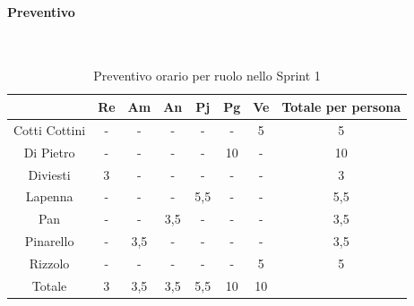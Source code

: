 \documentclass{article}
\begin{document}
                \paragraph{Preventivo}\mbox{}\\
                \begin{table}[H]
                    \centering
                    \begin{tabular}{|c|c|c|c|c|c|c|c|}
                    \hline
                                  & Re  & Am  & An  & Pj  & Pg  & Ve  & Totale per persona \\ \hline
                    Cotti Cottini & -   & -   & -   & -   & -   & 5   & 5                  \\ \hline
                    Di Pietro     & -   & -   & -   & -   & 10  & -   & 10                 \\ \hline
                    Diviesti      & 3   & -   & -   & -   & -   & -   & 3                  \\ \hline
                    Lapenna       & -   & -   & -   & 5,5 & -   & -   & 5,5                \\ \hline
                    Pan           & -   & -   & 3,5 & -   & -   & -   & 3,5                \\ \hline
                    Pinarello     & -   & 3,5 & -   & -   & -   & -   & 3,5                \\ \hline
                    Rizzolo       & -   & -   & -   & -   & -   & 5   & 5                  \\ \hline
                    Totale        & 3   & 3,5 & 3,5 & 5,5 & 10  & 10  &                    \\ \hline
                    \end{tabular}
                    \caption{Preventivo orario per ruolo nello Sprint 1}
                \end{table}

\end{document}
